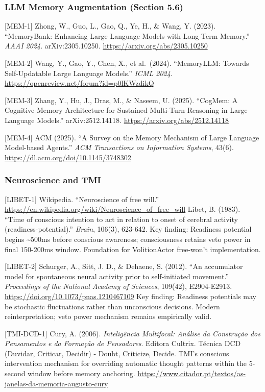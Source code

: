 \documentclass[
  11pt,
]{article}
\begin{document}
\subsubsection{LLM Memory Augmentation (Section
5.6)}\label{llm-memory-augmentation-section-5.6}

{[}MEM-1{]} Zhong, W., Guo, L., Gao, Q., Ye, H., \& Wang, Y. (2023).
``MemoryBank: Enhancing Large Language Models with Long-Term Memory.''
\emph{AAAI 2024}. arXiv:2305.10250.
\url{https://arxiv.org/abs/2305.10250}

{[}MEM-2{]} Wang, Y., Gao, Y., Chen, X., et al.~(2024). ``MemoryLLM:
Towards Self-Updatable Large Language Models.'' \emph{ICML 2024}.
\url{https://openreview.net/forum?id=p0lKWzdikQ}

{[}MEM-3{]} Zhang, Y., Hu, J., Dras, M., \& Naseem, U. (2025). ``CogMem:
A Cognitive Memory Architecture for Sustained Multi-Turn Reasoning in
Large Language Models.'' arXiv:2512.14118.
\url{https://arxiv.org/abs/2512.14118}

{[}MEM-4{]} ACM (2025). ``A Survey on the Memory Mechanism of Large
Language Model-based Agents.'' \emph{ACM Transactions on Information
Systems}, 43(6). \url{https://dl.acm.org/doi/10.1145/3748302}

\subsubsection{Neuroscience and TMI}\label{neuroscience-and-tmi}

{[}LIBET-1{]} Wikipedia. ``Neuroscience of free will.''
\url{https://en.wikipedia.org/wiki/Neuroscience_of_free_will} Libet, B.
(1983). ``Time of conscious intention to act in relation to onset of
cerebral activity (readiness-potential).'' \emph{Brain}, 106(3),
623-642. Key finding: Readiness potential begins \textasciitilde500ms
before conscious awareness; consciousness retains veto power in final
150-200ms window. Foundation for VolitionActor free-won't
implementation.

{[}LIBET-2{]} Schurger, A., Sitt, J. D., \& Dehaene, S. (2012). ``An
accumulator model for spontaneous neural activity prior to
self-initiated movement.'' \emph{Proceedings of the National Academy of
Sciences}, 109(42), E2904-E2913.
\url{https://doi.org/10.1073/pnas.1210467109} Key finding: Readiness
potentials may be stochastic fluctuations rather than unconscious
decisions. Modern reinterpretation; veto power mechanism remains
empirically valid.

{[}TMI-DCD-1{]} Cury, A. (2006). \emph{Inteligência Multifocal: Análise
da Construção dos Pensamentos e da Formação de Pensadores}. Editora
Cultrix. Técnica DCD (Duvidar, Criticar, Decidir) - Doubt, Criticize,
Decide. TMI's conscious intervention mechanism for overriding automatic
thought patterns within the 5-second window before memory anchoring.
\url{https://www.citador.pt/textos/as-janelas-da-memoria-augusto-cury}
\end{document}
